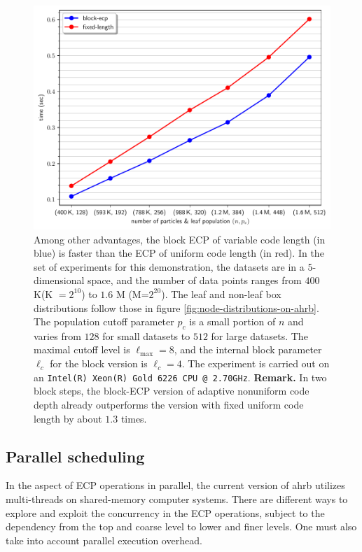 \documentclass[final]{juliacon}
\begin{document}
%
%
%
%
%
%

\begin{figure}[b]
  \centering
  \includegraphics[width=.85\linewidth]
  {images/block-ecp-vs-fixed-length.pdf}
  \caption{ %
    Among other advantages, the block ECP of variable code length (in blue) is faster than the ECP of uniform code length (in red).  In the set of experiments for this demonstration, the datasets are in a $5$-dimensional space, and the number of data points ranges from $400\!$ K(K $=2^{10}$) to $1.6\!$ M (M=$2^{20}$). The leaf and non-leaf box distributions follow those in figure \cref{fig:node-distributions-on-ahrb}. The population cutoff parameter $p_c$ is a small portion of $n$ and varies from $128$ for small datasets to $512$ for large datasets. The maximal cutoff level is $\ell_{\max}=8$, and the internal block parameter $\ell_{c}$ for the block version is $\ell_c=4$. The experiment is carried out on an \texttt{Intel(R) Xeon(R) Gold 6226 CPU @ 2.70GHz}. {\bf Remark.} In two block steps, the block-ECP version of adaptive nonuniform code depth already outperforms the version with fixed uniform code length by about $1.3$ times. 
  }
  \label{fig:block-ecp-vs-fixed-length}
\end{figure} %


 
%
%
%


\subsection{Parallel scheduling}

%
%
%
%
%
%

%
%

In the aspect of ECP operations in parallel, the current version of {\sc ahrb}
utilizes multi-threads on shared-memory computer systems. There are different
ways to explore and exploit the concurrency in the ECP operations, subject to
the dependency from the top and coarse level to lower and finer levels. One must
also take into account parallel execution overhead.
\end{document}
